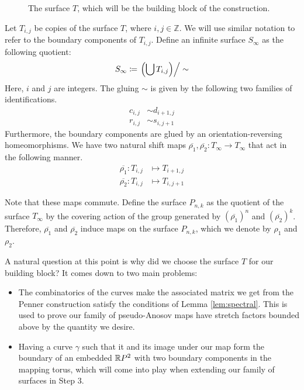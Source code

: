 \begin{figure}[]
    \centering
    \caption{The surface $T$, which will be the building block of the construction.}
    \label{fig:buildingblock}
\end{figure}

Let $T_{i,j}$ be copies of the surface $T$, where $i,j \in \mathbb{Z}$. We will use similar notation to refer
to the boundary components of $T_{i,j}$. Define an infinite surface $S_\infty$ as the following quotient:
\begin{align*}
  S_\infty \coloneqq \left. \left( \bigcup T_{i,j} \right)\right/\sim
\end{align*}
Here, $i$ and $j$ are integers. The gluing $\sim$ is given by the following two families of
identifications.
\begin{align*}
  c_{i,j} &\sim d_{i+1,j} \\
  r_{i,j} &\sim s_{i,j+1}
\end{align*}
Furthermore, the boundary components are glued by an orientation-reversing homeomorphisms.  We have two
natural shift maps $\overline{\rho_1},\overline{\rho_2}: T_\infty \to T_\infty$ that act in the
following manner.
\begin{align*}
  \overline{\rho_1}: T_{i,j} &\mapsto T_{i+1, j} \\
  \overline{\rho_2}: T_{i,j} &\mapsto T_{i, j+1}
\end{align*}

Note that these maps commute. Define the surface $P_{n,k}$ as the quotient of the surface $T_\infty$ by the
covering action of the group generated by $(\overline{\rho_1})^n$ and $(\overline{\rho_2})^k$. Therefore,
$\overline{\rho_1}$ and $\overline{\rho_2}$ induce maps on the surface $P_{n,k}$, which we denote by $\rho_1$
and $\rho_2$.

A natural question at this point is why did we choose the surface $T$ for our building block? It comes down to
two main problems:
\begin{itemize}
\item The combinatorics of the curves make the associated matrix we get from the Penner construction satisfy
  the conditions of Lemma \ref{lem:spectral}. This is used to prove our family of pseudo-Anosov maps have
  stretch factors bounded above by the quantity we desire.
\item Having a curve $\gamma$ such that it and its image under our map form the boundary of an embedded
  $\mathbb{R} P^2$ with two boundary components in the mapping torus, which will come into play when extending our family of surfaces in Step 3.
\end{itemize}

